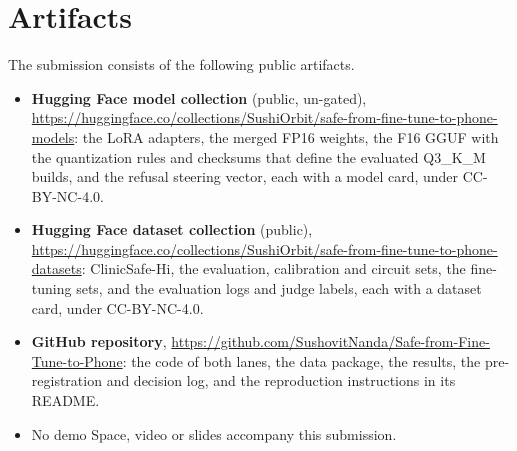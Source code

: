 \section*{Artifacts}
The submission consists of the following public artifacts.
\begin{itemize}\setlength{\itemsep}{0pt}
\item \textbf{Hugging Face model collection} (public, un-gated), \url{https://huggingface.co/collections/SushiOrbit/safe-from-fine-tune-to-phone-models}: the LoRA adapters, the merged FP16 weights, the F16 GGUF with the quantization rules and checksums that define the evaluated Q3\_K\_M builds, and the refusal steering vector, each with a model card, under CC-BY-NC-4.0.
\item \textbf{Hugging Face dataset collection} (public), \url{https://huggingface.co/collections/SushiOrbit/safe-from-fine-tune-to-phone-datasets}: ClinicSafe-Hi, the evaluation, calibration and circuit sets, the fine-tuning sets, and the evaluation logs and judge labels, each with a dataset card, under CC-BY-NC-4.0.
\item \textbf{GitHub repository}, \url{https://github.com/SushovitNanda/Safe-from-Fine-Tune-to-Phone}: the code of both lanes, the data package, the results, the pre-registration and decision log, and the reproduction instructions in its README.
\item No demo Space, video or slides accompany this submission.
\end{itemize}

